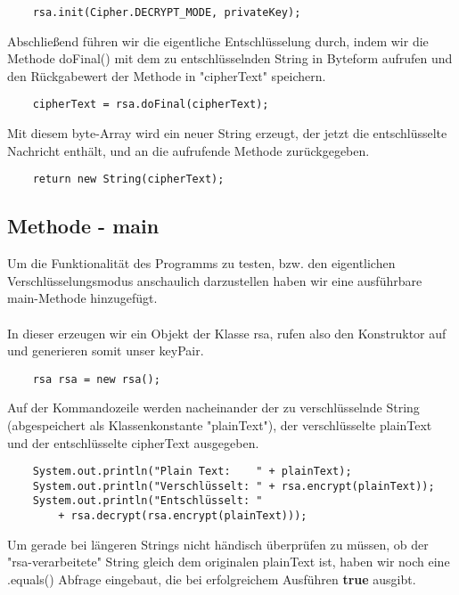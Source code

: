 \documentclass[12pt]{article}
\begin{document}
\begin{lstlisting}
    rsa.init(Cipher.DECRYPT_MODE, privateKey);
\end{lstlisting}

Abschließend führen wir die eigentliche Entschlüsselung durch, indem wir die Methode doFinal() mit dem zu entschlüsselnden String in Byteform aufrufen und den Rückgabewert der Methode in "cipherText" speichern.

\begin{lstlisting}
    cipherText = rsa.doFinal(cipherText);
\end{lstlisting}

Mit diesem byte-Array wird ein neuer String erzeugt, der jetzt die entschlüsselte Nachricht enthält, und an die aufrufende Methode zurückgegeben.

\begin{lstlisting}
    return new String(cipherText);
\end{lstlisting}

\newpage

\subsection{Methode - main}

Um die Funktionalität des Programms zu testen, bzw. den eigentlichen Verschlüsselungsmodus anschaulich darzustellen haben wir eine ausführbare main-Methode hinzugefügt.\\ \\
In dieser erzeugen wir ein Objekt der Klasse rsa, rufen also den Konstruktor auf und generieren somit unser keyPair.

\begin{lstlisting}
    rsa rsa = new rsa();
\end{lstlisting}

Auf der Kommandozeile werden nacheinander der zu verschlüsselnde String (abgespeichert als Klassenkonstante "plainText"), der verschlüsselte plainText und der entschlüsselte cipherText ausgegeben.

\begin{lstlisting}
    System.out.println("Plain Text:    " + plainText);
    System.out.println("Verschlüsselt: " + rsa.encrypt(plainText));
    System.out.println("Entschlüsselt: "
        + rsa.decrypt(rsa.encrypt(plainText)));
\end{lstlisting}

Um gerade bei längeren Strings nicht händisch überprüfen zu müssen, ob der "rsa-verarbeitete" String gleich dem originalen plainText ist, haben wir noch eine .equals() Abfrage eingebaut, die bei erfolgreichem Ausführen \textbf{true} ausgibt.
\end{document}
